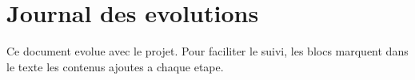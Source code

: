 %
\section*{Journal des evolutions}

Ce document evolue avec le projet. Pour faciliter le suivi, les blocs
marquent dans le texte les contenus ajoutes a chaque etape.

